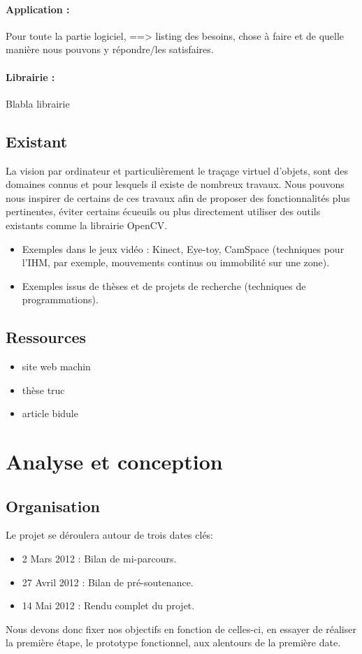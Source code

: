 \documentclass{article}
\begin{document}
			\paragraph{Application :\\}
Pour toute la partie logiciel, 
==> listing des besoins, chose à faire et de quelle manière nous pouvons y répondre/les satisfaires.
			\paragraph{Librairie :\\}
				Blabla librairie
		\subsection{Existant}
		La vision par ordinateur et particulièrement le traçage virtuel d'objets, sont des domaines connus et pour lesquels il existe de nombreux travaux. Nous pouvons nous inspirer de certains de ces travaux afin de proposer des fonctionnalités plus pertinentes, éviter certains écueuils ou plus directement utiliser des outils existants comme la librairie OpenCV.\\
			\begin{itemize}
				\item Exemples dans le jeux vidéo : Kinect, Eye-toy, CamSpace (techniques pour l'IHM, par exemple, mouvements continus ou immobilité sur une zone).
				\item Exemples issus de thèses et de projets de recherche (techniques de programmations).
			\end{itemize}
		\subsection{Ressources}
			\begin{itemize}
				\item{site web machin}
				\item{thèse truc}
				\item{article bidule}
			\end{itemize}
				
	\section{Analyse et conception}
		\subsection{Organisation}
		Le projet se déroulera autour de trois dates clés:
			\begin{itemize}
				\item 2 Mars 2012 : Bilan de mi-parcours.  
				\item 27 Avril 2012 : Bilan de pré-soutenance.
				\item 14 Mai 2012 : Rendu complet du projet.
			\end{itemize}
			Nous devons donc fixer nos objectifs en fonction de celles-ci, en essayer de réaliser la première étape, le prototype fonctionnel, aux alentours de la première date.
		
\end{document}
